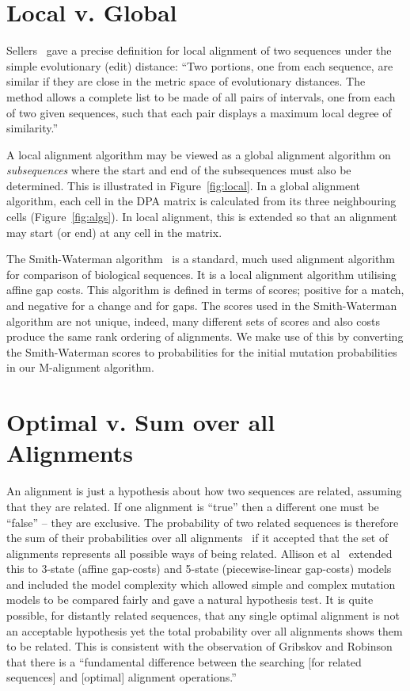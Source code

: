 \documentclass[letterpaper,11pt,oneside]{article}
\begin{document}
\section{Local v. Global}

Sellers~\cite{sellers80} gave a precise definition for local alignment
of two sequences under the simple evolutionary (edit) distance:
``Two portions, one from each sequence, are similar if they are close
in the metric space of evolutionary distances. The method allows
a complete list to be made of all pairs of intervals,
one from each of two given sequences, such that each pair
displays a maximum local degree of similarity.''

A local alignment algorithm may be viewed as a global alignment algorithm on
{\em subsequences} where the start and end of the subsequences must also be determined.
This is illustrated in Figure~\ref{fig:local}.  In a global alignment
algorithm, each cell in the DPA matrix is calculated from its three
neighbouring cells (Figure~\ref{fig:algs}). In local alignment, this is
extended so that an alignment may start (or end) at any cell in the matrix.

The Smith-Waterman algorithm~\cite{smith81} is a standard,
much used alignment algorithm for comparison of biological sequences.
It is a local alignment
algorithm utilising affine gap costs.  This algorithm is defined in terms of
scores; positive for a match, and negative for a change and for gaps.  The
scores used in the Smith-Waterman algorithm are not unique, indeed, many
different sets of scores and also costs produce the same rank ordering of
alignments.  We make use of this by converting the Smith-Waterman scores to
probabilities for the initial mutation probabilities in our M-alignment
algorithm.


\section{Optimal v. Sum over all Alignments}

An alignment is just a hypothesis about how two sequences are related,
assuming that they are related.  If one alignment is ``true'' then
a different one must be ``false'' -- they are exclusive.
The probability of two related sequences is therefore the sum of
their probabilities over all alignments~\cite{bishop86}
if it accepted that the set of alignments represents all
possible ways of being related.
Allison et al~\cite{allison92a} extended this to 3-state (affine gap-costs)
and 5-state (piecewise-linear gap-costs) models and included
the model complexity which allowed simple and complex
mutation models to be compared fairly and gave a natural hypothesis test.
It is quite possible, for distantly related sequences, that any single
optimal alignment is not an acceptable hypothesis yet the total probability
over all alignments shows them to be related.
This is consistent with the observation of
Gribskov and Robinson~\cite{gribskov96} that there is
a ``fundamental difference between the searching [for related sequences]
and [optimal] alignment operations.''
\end{document}
